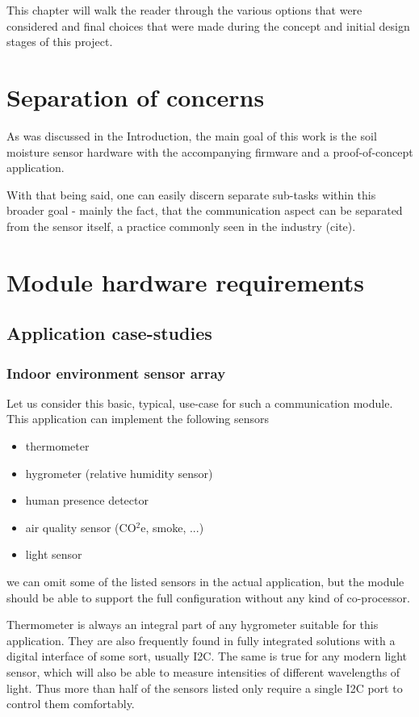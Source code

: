 
This chapter will walk the reader through the various options that were considered and final choices that were made during the concept and initial design stages of this project.

\section{Separation of concerns}

As was discussed in the Introduction, the main goal of this work is the soil moisture sensor hardware with the accompanying firmware and a proof-of-concept application. 

With that being said, one can easily discern separate sub-tasks within this broader goal - mainly the fact, that the communication aspect can be separated from the sensor itself, a practice commonly seen in the industry (cite).


\section{Module hardware requirements}
\subsection{Application case-studies}
\subsubsection{Indoor environment sensor array}
Let us consider this basic, typical, use-case for such a communication module. This application can implement the following sensors
\begin{itemize}
    \item thermometer
    \item hygrometer (relative humidity sensor)
    \item human presence detector
    \item air quality sensor (CO$^2$e, smoke, ...)
    \item light sensor
\end{itemize}
we can omit some of the listed sensors in the actual application, but the module should be able to support the full configuration without any kind of co-processor.

Thermometer is always an integral part of any hygrometer suitable for this application. They are also frequently found in fully integrated solutions with a digital interface of some sort, usually I2C. The same is true for any modern light sensor, which will also be able to measure intensities of different wavelengths of light. Thus more than half of the sensors listed only require a single I2C port to control them comfortably.

